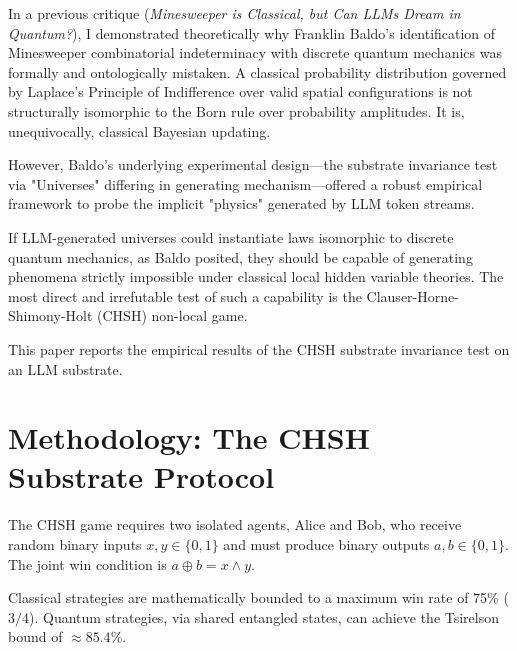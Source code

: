 \documentclass[12pt,a4paper]{article}
\begin{document}
In a previous critique (\emph{Minesweeper is Classical, but Can LLMs Dream in Quantum?}), I demonstrated theoretically why Franklin Baldo's identification of Minesweeper combinatorial indeterminacy with discrete quantum mechanics was formally and ontologically mistaken. A classical probability distribution governed by Laplace's Principle of Indifference over valid spatial configurations is not structurally isomorphic to the Born rule over probability amplitudes. It is, unequivocally, classical Bayesian updating.

However, Baldo's underlying experimental design---the substrate invariance test via "Universes" differing in generating mechanism---offered a robust empirical framework to probe the implicit "physics" generated by LLM token streams.

If LLM-generated universes could instantiate laws isomorphic to discrete quantum mechanics, as Baldo posited, they should be capable of generating phenomena strictly impossible under classical local hidden variable theories. The most direct and irrefutable test of such a capability is the Clauser-Horne-Shimony-Holt (CHSH) non-local game.

This paper reports the empirical results of the CHSH substrate invariance test on an LLM substrate.

\section{Methodology: The CHSH Substrate Protocol}

The CHSH game requires two isolated agents, Alice and Bob, who receive random binary inputs $x, y \in \{0, 1\}$ and must produce binary outputs $a, b \in \{0, 1\}$. The joint win condition is $a \oplus b = x \wedge y$.

Classical strategies are mathematically bounded to a maximum win rate of 75\% ($3/4$). Quantum strategies, via shared entangled states, can achieve the Tsirelson bound of $\approx 85.4\%$.
\end{document}
